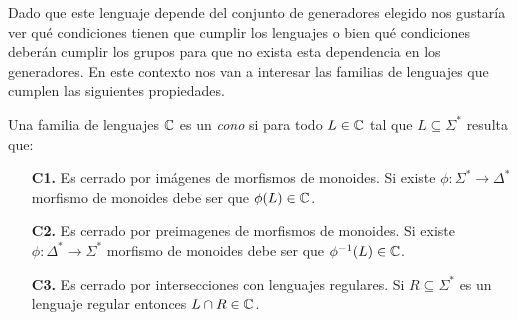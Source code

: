 \documentclass[tesis.tex]{subfiles}
\begin{document}
Dado que este lenguaje depende del conjunto de generadores elegido nos gustaría ver qué condiciones tienen que cumplir los lenguajes o bien qué condiciones deberán cumplir los grupos para que no exista esta dependencia en los generadores.
En este contexto nos van a interesar las familias de lenguajes que cumplen las siguientes propiedades.
\medskip
\begin{deff}
	Una familia de lenguajes $\mathbb{C}$ es un \emph{cono} si para todo $L \in \mathbb{C}$ tal que $L \subseteq \Sigma^*$ resulta que:
	\begin{itemize}
		\item[\textbf{C1.}] Es cerrado por imágenes de morfismos de monoides. 
		Si existe $\phi:\Sigma^* \to \Delta^*$ morfismo de monoides debe ser que $\phi(L) \in \mathbb{C}$.
		\item[\textbf{C2.}] Es cerrado por preimagenes de morfismos de monoides. 
		Si existe $\phi:\Delta^* \to \Sigma^*$ morfismo de monoides  debe ser que $\phi^{-1}(L) \in \mathbb{C}$. 
		\item[\textbf{C3.}] Es cerrado por intersecciones con lenguajes regulares. 
		Si $R \subseteq \Sigma^*$ es un lenguaje regular entonces $L \cap R \in \mathbb{C}$.
	\end{itemize}
\end{deff} 
\end{document}
